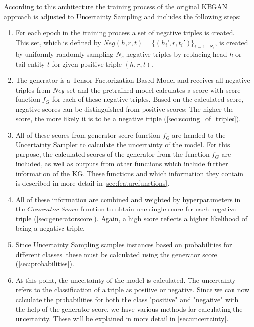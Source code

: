 According to this architecture the training process of the original \ac{KBGAN} approach is adjusted to Uncertainty Sampling and includes the following steps:
\begin{enumerate}
    \item For each epoch in the training process a set of negative triples is created.
    This set, which is defined by $Neg(h,r,t)=\{(h_i',r,t_i')\}_{i=1\dots N_s}$, is created by uniformly randomly sampling $N_s$ negative triples by replacing head $h$ or tail entity $t$ for given positive triple $(h, r, t)$.
    
    \item 
    The generator is a Tensor Factorization-Based Model and receives all negative triples from $Neg$ set and the pretrained model calculates a score with score function $f_G$ for each of these negative triples.
    Based on the calculated score, negative scores can be distinguished from positive scores:
    The higher the score, the more likely it is to be a negative triple (\autoref{sec:scoring_of_triples}).
    
    \item All of these scores from generator score function $f_G$ are handed to the Uncertainty Sampler to calculate the uncertainty of the model.
    For this purpose, the calculated scores of the generator from the function $f_G$ are included, as well as outputs from other functions which include further information of the \ac{KG}.
    These functions and which information they contain is described in more detail in \autoref{sec:featurefunctions}.
    
    \item All of these information are combined and weighted by hyperparameters in the $Generator\_Score$ function to obtain one single score for each negative triple (\autoref{sec:generatorscore}).
    Again, a high score reflects a higher likelihood of being a negative triple.
    
    \item Since Uncertainty Sampling samples instances based on probabilities for different classes, these must be calculated using the generator score (\autoref{sec:probabilities}).

    \item At this point, the uncertainty of the model is calculated.
    The uncertainty refers to the classification of a triple as positive or negative.
    Since we can now calculate the probabilities for both the class "positive" and "negative" with the help of the generator score, we have various methods for calculating the uncertainty.
    These will be explained in more detail in \autoref{sec:uncertainty}.
    

\end{enumerate}
